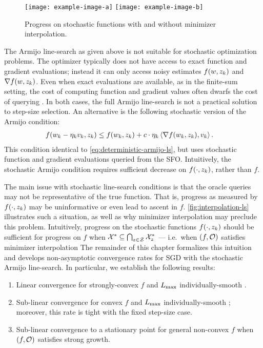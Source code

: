 \begin{figure}[t]
    \centering
    \texttt{[image: example-image-a]}
    \texttt{[image: example-image-b]}
    \caption{Progress on stochastic functions with and without minimizer interpolation.}%
    \label{fig:interpolation-ls}
\end{figure}

The Armijo line-search as given above is not suitable for stochastic optimization problems.
The optimizer typically does not have access to exact function and gradient evaluations; instead it can only access noisy estimates \( f(\w, \zk) \) and \( \grad(\w, \zk) \).
Even when exact evaluations are available, as in the finite-sum setting, the cost of computing function and gradient values often dwarfs the cost of querying \oracle{}. 
In both cases, the full Armijo line-search is not a practical solution to step-size selection.
An alternative is the following stochastic version of the Armijo condition:
\begin{align}
    f(\wk - \etak v_k, \zk) &\leq f(\wk, \zk) + c \cdot \etak \abr{\grad(\wk, \zk), v_k}. \label{eq:armijo-ls}
\end{align}
This condition identical to \autoref{eq:deterministic-armijo-ls}, but uses stochastic function and gradient evaluations queried from the \ac{SFO}.
Intuitively, the stochastic Armijo condition requires sufficient decrease on \( f(\cdot, \zk) \), rather than \( f \).

The main issue with stochastic line-search conditions is that the oracle queries may not be representative of the true function. 
That is, progress as measured by \( f(\cdot, \zk) \) may be uninformative or even lead to ascent in \( f \). 
\autoref{fig:interpolation-ls} illustrates such a situation, as well as why minimizer interpolation may preclude this problem. 
Intuitively, progress on the stochastic functions \( f(\cdot, \zk) \) should be sufficient for progress on \( f \) when \( \calX^* \subseteq \bigcap_{\z \in \calZ} \calX^*_{\z} \) --- i.e.\ when \( \rbr{f, \oracle{}} \) satisfies minimizer interpolation 
The remainder of this chapter formalizes this intuition and develops non-asymptotic convergence rates for \ac{SGD} with the stochastic Armijo line-search. 
In particular, we establish the following results:
\begin{enumerate}
    \item Linear convergence for strongly-convex \( f \) and \( \Lmax \) individually-smooth \oracle{}. 
    \item Sub-linear convergence for convex \( f \) and \( \Lmax \) individually-smooth \oracle{}; moreover, this rate is tight with the fixed step-size case.
    \item Sub-linear convergence to a stationary point for general non-convex \( f \) when \( \rbr{f, \oracle{}} \) satisfies strong growth.
\end{enumerate}

